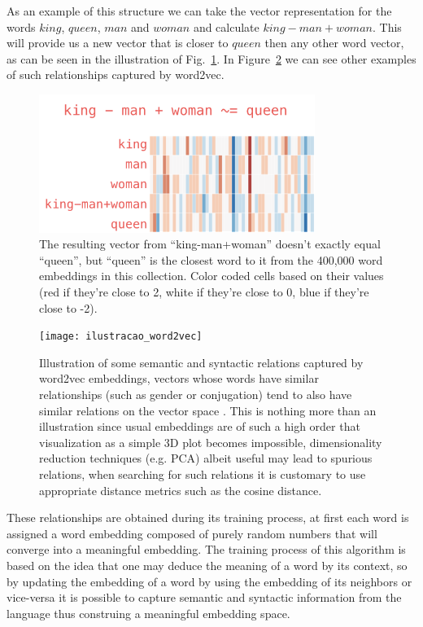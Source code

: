 As an example of this structure we can take the vector representation for the words $king$, $queen$, $man$ and $woman$ and calculate  $king - man + woman$. This will provide us a new vector that is closer to $queen$ then any other word vector, as can be seen in the illustration of Fig.~\ref{queen}. In Figure~\ref{figur_word2vec} we can see other examples of such relationships captured by word2vec.





\begin{figure}[!ht]
\centerline{\includegraphics[width=0.8\textwidth]{figuras/queen.png}}
\caption{The resulting vector from ``king-man+woman'' doesn't exactly equal ``queen'', but ``queen'' is the closest word to it from the 400,000 word embeddings in this collection. Color coded cells based on their values (red if they’re close to 2, white if they’re close to 0, blue if they’re close to -2). \citep{jallamarword2vec}}
\label{queen}
\end{figure}




\begin{figure}[!ht]
\centerline{\texttt{[image: ilustracao\_word2vec]}}
\caption{Illustration of some semantic and syntactic relations captured by word2vec embeddings, vectors whose words have similar relationships (such as gender or conjugation) tend to also have similar relations on the vector space \citep{ilustracao_word2vec}. This is nothing more than an illustration since usual embeddings are of such a high order that visualization as a simple 3D plot becomes impossible, dimensionality reduction techniques (e.g. PCA) albeit useful may lead to spurious relations, when searching for such relations it is customary to use appropriate distance metrics such as the cosine distance.}
\label{figur_word2vec}
\end{figure}

These relationships are obtained during its training process, at first each word is assigned a word embedding composed of purely random numbers that will converge into a meaningful embedding. The training process of this algorithm is based on the idea that one may deduce the meaning of a word by its context, so by updating the embedding of a word by using the embedding of its neighbors or vice-versa it is possible to capture semantic and syntactic information from the language thus construing a meaningful embedding space.

